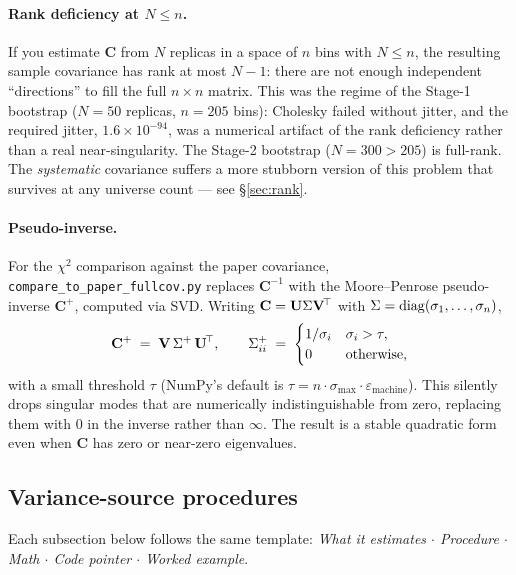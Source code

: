 \paragraph{Rank deficiency at $N \le n$.}
If you estimate $\mathbf{C}$ from $N$ replicas in a space of $n$ bins
with $N\le n$, the resulting sample covariance has rank at most
$N-1$: there are not enough independent ``directions'' to fill the
full $n\times n$ matrix. This was the regime of the Stage-1 bootstrap
($N=50$ replicas, $n=205$ bins): Cholesky failed without jitter, and
the required jitter, $1.6\times10^{-94}$, was a numerical
artifact of the rank deficiency rather than a real near-singularity.
The Stage-2 bootstrap ($N=300 > 205$) is full-rank. The
\emph{systematic} covariance suffers a more stubborn version of this
problem that survives at any universe count --- see \S\ref{sec:rank}.

\paragraph{Pseudo-inverse.}
For the $\chi^{2}$ comparison against the paper covariance,
\texttt{compare\_to\_paper\_fullcov.py} replaces $\mathbf{C}^{-1}$
with the Moore--Penrose pseudo-inverse $\mathbf{C}^{+}$, computed
via SVD. Writing $\mathbf{C}=\mathbf{U}\Sigma\mathbf{V}^{\!\top}$ with
$\Sigma=\mathrm{diag}(\sigma_{1},\dots,\sigma_{n})$,
\begin{equation}
\mathbf{C}^{+} \;=\; \mathbf{V}\,\Sigma^{+}\,\mathbf{U}^{\!\top},
\qquad
\Sigma^{+}_{ii} \;=\;
\begin{cases}
1/\sigma_{i} & \sigma_{i} > \tau,\\
0 & \text{otherwise},
\end{cases}
\end{equation}
with a small threshold $\tau$ (NumPy's default is
$\tau = n \cdot \sigma_{\max} \cdot \varepsilon_{\text{machine}}$).
This silently drops singular modes that are numerically
indistinguishable from zero, replacing them with $0$ in the inverse
rather than $\infty$. The result is a stable quadratic form even when
$\mathbf{C}$ has zero or near-zero eigenvalues.

\subsection{Variance-source procedures}
\label{sec:variance}

Each subsection below follows the same template:
\emph{What it estimates $\cdot$ Procedure $\cdot$ Math $\cdot$ Code
pointer $\cdot$ Worked example}.

